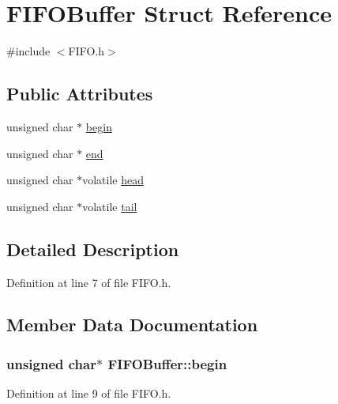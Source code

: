 \hypertarget{struct_f_i_f_o_buffer}{}\section{F\+I\+F\+O\+Buffer Struct Reference}
\label{struct_f_i_f_o_buffer}


{\ttfamily \#include $<$F\+I\+F\+O.\+h$>$}

\subsection*{Public Attributes}
\begin{DoxyCompactItemize}
\item 
unsigned char $\ast$ \hyperlink{struct_f_i_f_o_buffer_a88e585d52d3bce5764d78ddd25d6b053}{begin}
\item 
unsigned char $\ast$ \hyperlink{struct_f_i_f_o_buffer_a1e404b7d86d0e1c46008cf0f71981b37}{end}
\item 
unsigned char $\ast$volatile \hyperlink{struct_f_i_f_o_buffer_a5c28bb45789016ae0dcf355453ebf116}{head}
\item 
unsigned char $\ast$volatile \hyperlink{struct_f_i_f_o_buffer_a47d3fe1e057e44a108ea92b59b67e71a}{tail}
\end{DoxyCompactItemize}


\subsection{Detailed Description}


Definition at line 7 of file F\+I\+F\+O.\+h.



\subsection{Member Data Documentation}
\subsubsection[{\texorpdfstring{begin}{begin}}]{\setlength{\rightskip}{0pt plus 5cm}unsigned char$\ast$ F\+I\+F\+O\+Buffer\+::begin}\hypertarget{struct_f_i_f_o_buffer_a88e585d52d3bce5764d78ddd25d6b053}{}\label{struct_f_i_f_o_buffer_a88e585d52d3bce5764d78ddd25d6b053}


Definition at line 9 of file F\+I\+F\+O.\+h.

